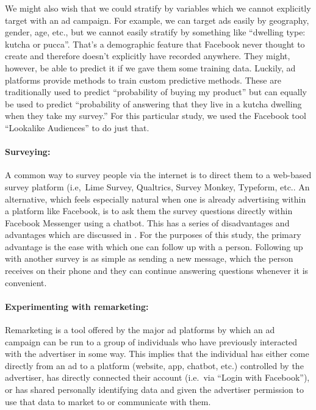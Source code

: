 \documentclass[a4paper,12pt]{article}
\begin{document}
We might also wish that we could stratify by variables which we cannot explicitly target with an ad campaign. For example, we can target ads easily by geography, gender, age, etc., but we cannot easily stratify by something like ``dwelling type: kutcha or pucca''. That's a demographic feature that Facebook never thought to create and therefore doesn't explicitly have recorded anywhere. They might, however, be able to predict it if we gave them some training data. Luckily, ad platforms provide methods to train custom predictive methods. These are traditionally used to predict ``probability of buying my product'' but can equally be used to predict ``probability of answering that they live in a kutcha dwelling when they take my survey.'' For this particular study, we used the Facebook tool ``Lookalike Audiences'' to do just that. 

\paragraph{Surveying:} A common way to survey people via the internet is to direct them to a web-based survey platform (i.e,\ Lime Survey, Qualtrics, Survey Monkey, Typeform, etc.\). An alternative, which feels especially natural when one is already advertising within a platform like Facebook, is to ask them the survey questions directly within Facebook Messenger using a chatbot. This has a series of disadvantages and advantages which are discussed in \cite{Rao2020}. For the purposes of this study, the primary advantage is the ease with which one can follow up with a person. Following up with another survey is as simple as sending a new message, which the person receives on their phone and they can continue answering questions whenever it is convenient. 


\paragraph{Experimenting with remarketing:} Remarketing is a tool offered by the major ad platforms by which an ad campaign can be run to a group of individuals who have previously interacted with the advertiser in some way. This implies that the individual has either come directly from an ad to a platform (website, app, chatbot, etc.) controlled by the advertiser, has directly connected their account (i.e.\ via ``Login with Facebook''), or has shared personally identifying data and given the advertiser permission to use that data to market to or communicate with them.
\end{document}
